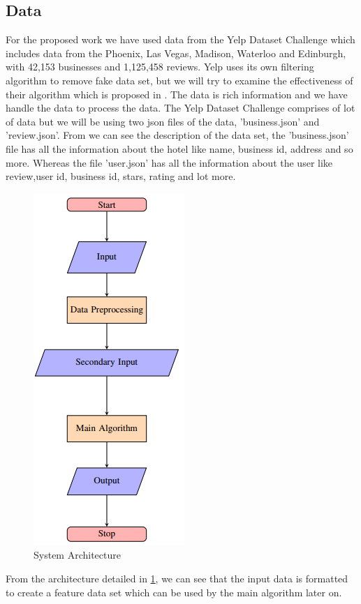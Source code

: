\documentclass[sigconf]{acmart}
\begin{document}
\subsection{Data}
For the proposed work we have used data from the Yelp Dataset Challenge which includes data from the Phoenix, Las Vegas, Madison, Waterloo and Edinburgh, with 42,153 businesses and 1,125,458 reviews. Yelp uses its own filtering algorithm to remove fake data set, but we will try to examine the effectiveness of their algorithm which is proposed in \cite{originalPaper}. The data is rich information and we have handle the data to process the data. The Yelp Dataset Challenge comprises of lot of data but we will be using two json files of the data, 'business.json' and 'review.json'.  From \cite{yelpdatasetchalleng} we can see the description of the data set, the 'business.json' file has all the information about the hotel like name, business id, address and so more. Whereas the file 'user.json' has all the information about the user like review,user id, business id, stars, rating and lot more.
\begin{figure}
  \centering\includegraphics[scale=1.0]{images/Capture.png}
  \caption{System Architecture \cite{originalPaper}}\label{f:archi}
\end{figure}

From the architecture detailed in \ref{f:archi}, we can see that the input data is formatted to create a feature data set which can be used by the main algorithm later on.
\end{document}
